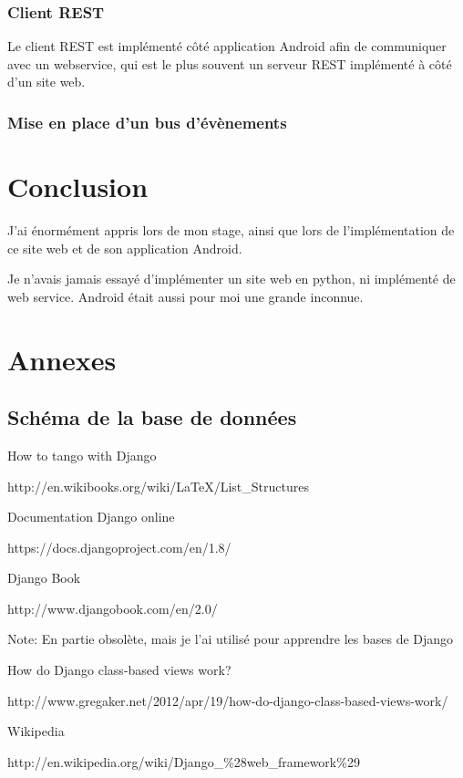 \documentclass[12pt,table,a4paper]{report}
\begin{document}
\subsection{Client REST}
Le client REST est implémenté côté application Android afin de communiquer avec un webservice, qui est le plus souvent un serveur REST implémenté à côté d'un site web.

\subsection{Mise en place d'un bus d'évènements}

\chapter{Conclusion}
J'ai énormément appris lors de mon stage, ainsi que lors de l'implémentation de ce site web et de son application Android.

Je n'avais jamais essayé d'implémenter un site web en python, ni implémenté de web service. Android était aussi pour moi une grande inconnue.

\chapter{Annexes}
\section{Schéma de la base de données}

\begin{thebibliography}{breitestes Label}
	    How to tango with Django
	    
	    http://en.wikibooks.org/wiki/LaTeX/List\_Structures
	
		Documentation Django online
		
		https://docs.djangoproject.com/en/1.8/
	
	    Django Book
	    
	    http://www.djangobook.com/en/2.0/
	    
	    Note: En partie obsolète, mais je l'ai utilisé pour apprendre les bases de Django
	    
        How do Django class-based views work?
        
        http://www.gregaker.net/2012/apr/19/how-do-django-class-based-views-work/
        
        Wikipedia
        
        http://en.wikipedia.org/wiki/Django\_\%28web\_framework\%29
\end{thebibliography}
\end{document}
